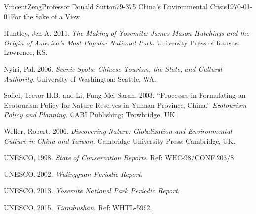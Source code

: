 \documentclass[12pt]{article}
\begin{document}
\begin{mla}{Vincent}{Zeng}{Professor Donald Sutton}{79-375 China's Environmental Crisis}{\today}{For the Sake of a View}
\begin{workscited}
\bibent
Huntley, Jen A. 2011. \textit{The Making of Yosemite: James Mason Hutchings and the Origin of America's Most Popular National Park.} University Press of Kansas: Lawrence, KS.


\bibent
Nyiri, Pal. 2006. \textit{Scenic Spots: Chinese Tourism, the State, and Cultural Authority.} University of Washington: Seattle, WA.

\bibent
Sofiel, Trevor H.B. and Li, Fung Mei Sarah. 2003. ``Processes in Formulating an Ecotourism Policy for Nature Reserves in Yunnan Province, China.'' \textit{Ecotourism Policy and Planning.} CABI Publishing: Trowbridge, UK.

\bibent
Weller, Robert. 2006. \textit{Discovering Nature: Globalization and Environmental Culture in China and Taiwan.} Cambridge University Press: Cambridge, UK.

\bibent
UNESCO, 1998. \textit{State of Conservation Reports}. Ref: WHC-98/CONF.203/8

\bibent
UNESCO. 2002. \textit{Wulingyuan Periodic Report}.

\bibent
UNESCO. 2013. \textit{Yosemite National Park Periodic Report}.

\bibent
UNESCO. 2015. \textit{Tianzhushan}. Ref: WHTL-5992.
\end{workscited}
\end{mla}
\end{document}

